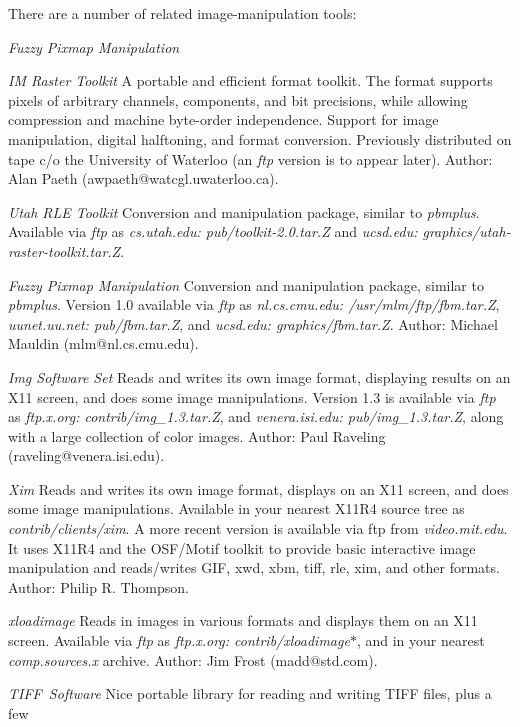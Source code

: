 There are a number of related image-manipulation tools:
\begin{TPlist}{{\it Fuzzy Pixmap Manipulation}}
\item[{{\it IM Raster Toolkit}}]
A portable and efficient format toolkit.  The format supports pixels of
arbitrary channels, components, and bit precisions, while allowing
compression and machine byte-order independence.  Support for image
manipulation, digital halftoning, and format conversion.  Previously
distributed on tape c/o the University of Waterloo (an {\it ftp}
version is to appear later).  Author: Alan Paeth
(awpaeth@watcgl.uwaterloo.ca).
\item[{{\it Utah RLE Toolkit}}]
Conversion and manipulation package, similar to {\it pbmplus}.  Available
via {\it ftp} as {\it cs.utah.edu: pub/toolkit-2.0.tar.Z} and {\it
ucsd.edu: graphics\-/utah-raster-toolkit.\-tar.Z}.
\item[{{\it Fuzzy Pixmap Manipulation}}]
Conversion and manipulation package, similar to {\it pbmplus}.  Version
1.0 available via {\it ftp} as {\it
nl.cs.cmu.edu: /usr/mlm/ftp/fbm.tar.Z}, {\it
uunet.uu.net: pub/fbm.tar.Z}, and {\it ucsd.edu: graphics/fbm.tar.Z}.
Author: Michael Mauldin (mlm@nl.cs.cmu.edu).
\item[{{\it Img Software Set}}]
Reads and writes its own image format, displaying results on an X11
screen, and does some image manipulations.  Version 1.3 is available via
{\it ftp} as {\it ftp.x.org: contrib/img\_1.3.tar.Z}, and {\it
venera.isi.edu: pub/img\_1.3.tar.Z}, along with a large collection of
color images.  Author: Paul Raveling (raveling@venera.isi.edu).
\item[{{\it Xim}}]
Reads and writes its own image format, displays on an X11 screen, and
does some image manipulations.  Available in your nearest X11R4 source
tree as {\it contrib/clients/xim}.  A more recent version is available
via ftp from {\it video.mit.edu}.  It uses X11R4 and the OSF/Motif
toolkit to provide basic interactive image manipulation and reads/writes
GIF, xwd, xbm, tiff, rle, xim, and other formats.  Author: Philip R.
Thompson.
\item[{{\it xloadimage}}]
Reads in images in various formats and displays them on an X11 screen.
Available via {\it ftp} as {\it
ftp.x.org: contrib/xloadimage$\ast$}, and in your nearest {\it
comp.sources.\-x} archive.  Author: Jim Frost (madd@std.\-com).
\item[{{\it TIFF\ Software}}]
Nice portable library for reading and writing TIFF files, plus a few

\end{TPlist}
